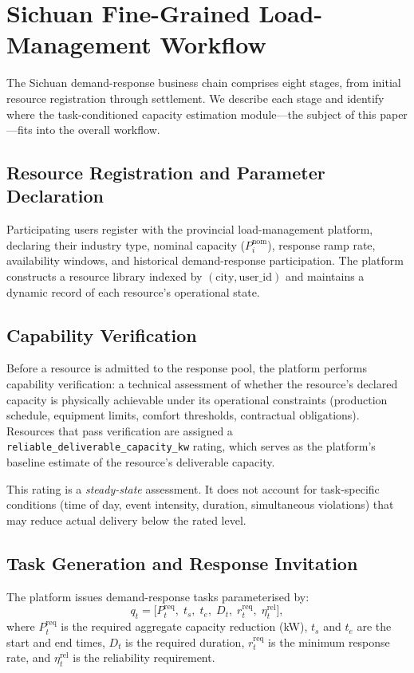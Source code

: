 \documentclass[utf8]{FrontiersinHarvard}
\newcommand{\Preq}{P^{\mathrm{req}}}
\begin{document}
\section{Sichuan Fine-Grained Load-Management Workflow}
\label{sec:workflow}

The Sichuan demand-response business chain comprises eight stages,
from initial resource registration through settlement. We describe
each stage and identify where the task-conditioned capacity
estimation module---the subject of this paper---fits into the
overall workflow.

\subsection{Resource Registration and Parameter Declaration}

Participating users register with the provincial load-management
platform, declaring their industry type, nominal capacity
($P_i^{\mathrm{nom}}$), response ramp rate, availability windows,
and historical demand-response participation. The platform
constructs a resource library indexed by
$(\mathrm{city}, \mathrm{user\_id})$ and maintains a dynamic
record of each resource's operational state.

\subsection{Capability Verification}

Before a resource is admitted to the response pool, the platform
performs capability verification: a technical assessment of
whether the resource's declared capacity is physically achievable
under its operational constraints (production schedule, equipment
limits, comfort thresholds, contractual obligations). Resources
that pass verification are assigned a
\texttt{reliable\_deliverable\_capacity\_kw} rating, which serves
as the platform's baseline estimate of the resource's
deliverable capacity.

This rating is a \emph{steady-state} assessment. It does not
account for task-specific conditions (time of day, event intensity,
duration, simultaneous violations) that may reduce actual delivery
below the rated level.

\subsection{Task Generation and Response Invitation}

The platform issues demand-response tasks parameterised by:
\begin{equation}
    q_t = \bigl[\Preq_t,\; t_s,\; t_e,\; D_t,\;
    r_t^{\mathrm{req}},\; \eta_t^{\mathrm{rel}}\bigr],
    \label{eq:task_def}
\end{equation}
where $\Preq_t$ is the required aggregate capacity reduction
(kW), $t_s$ and $t_e$ are the start and end times, $D_t$ is the
required duration, $r_t^{\mathrm{req}}$ is the minimum response
rate, and $\eta_t^{\mathrm{rel}}$ is the reliability requirement.
\end{document}
